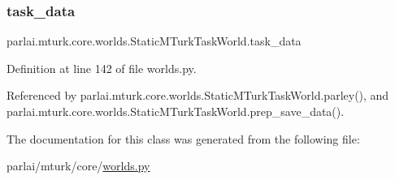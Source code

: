 \mbox{\label{classparlai_1_1mturk_1_1core_1_1worlds_1_1StaticMTurkTaskWorld_ad8f9036d50f5787b4872609a17c267e0}} 
\subsubsection{\texorpdfstring{task\+\_\+data}{task\_data}}
{\footnotesize\ttfamily parlai.\+mturk.\+core.\+worlds.\+Static\+M\+Turk\+Task\+World.\+task\+\_\+data}



Definition at line 142 of file worlds.\+py.



Referenced by parlai.\+mturk.\+core.\+worlds.\+Static\+M\+Turk\+Task\+World.\+parley(), and parlai.\+mturk.\+core.\+worlds.\+Static\+M\+Turk\+Task\+World.\+prep\+\_\+save\+\_\+data().



The documentation for this class was generated from the following file\+:\begin{DoxyCompactItemize}
\item 
parlai/mturk/core/\hyperlink{parlai_2mturk_2core_2worlds_8py}{worlds.\+py}\end{DoxyCompactItemize}
